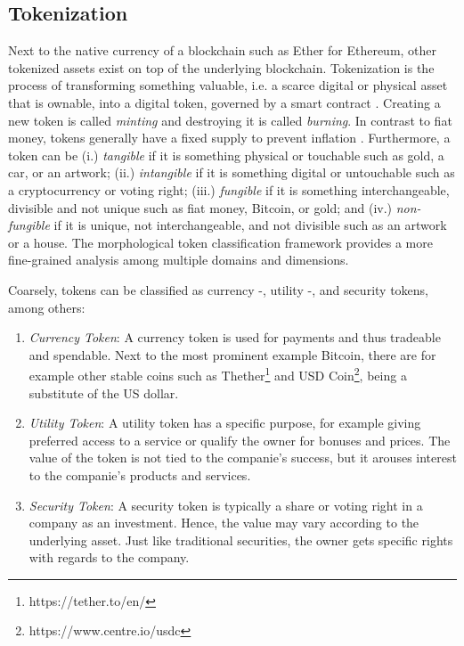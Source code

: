 \subsection{Tokenization}
\label{subsec:tokenization}

Next to the native currency of a blockchain such as Ether for Ethereum, other tokenized assets exist on top of the underlying blockchain. Tokenization is the process of transforming something valuable, i.e. a scarce digital or physical asset that is ownable, into a digital token, governed by a smart contract \cite{chenBlockchainTokensPotential2018}. Creating a new token is called \emph{minting} and destroying it is called \emph{burning}. In contrast to fiat money, tokens generally have a fixed supply to prevent inflation \cite{chenBlockchainTokensPotential2018}. Furthermore, a token can be (i.) \emph{tangible} if it is something physical or touchable such as gold, a car, or an artwork; (ii.) \emph{intangible} if it is something digital or untouchable such as a cryptocurrency or voting right; (iii.) \emph{fungible} if it is something interchangeable, divisible and not
unique such as fiat money, Bitcoin, or gold; and (iv.) \emph{non-fungible} if it is unique, not interchangeable, and not divisible such as an artwork or a house. The morphological token classification framework \cite{freniTokenomicsBlockchainTokens2022} provides a more fine-grained analysis among multiple domains and dimensions.

Coarsely, tokens can be classified as currency -, utility -, and security tokens, among others:

\begin{enumerate}
    \item \emph{Currency Token}: A currency token is used for payments and thus tradeable and spendable. Next to the most prominent example Bitcoin, there are for example other stable coins such as Thether\footnote{https://tether.to/en/} and USD Coin\footnote{https://www.centre.io/usdc}, being a substitute of the US dollar. 
    \item \emph{Utility Token}: A utility token has a specific purpose, for example giving preferred access to a service or qualify the owner for bonuses and prices. The value of the token is not tied to the companie's success, but it arouses interest to the companie's products and services.
    \item \emph{Security Token}: A security token is typically a share or voting right in a company as an investment. Hence, the value may vary according to the underlying asset. Just like traditional securities, the owner gets specific rights with regards to the company.
\end{enumerate}

